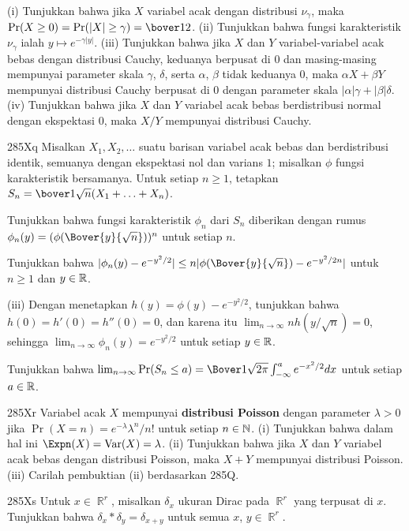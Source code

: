 {

\noindent (i) Tunjukkan bahwa jika $X$ variabel acak dengan distribusi
$\nu_{\gamma}$, maka $\Pr(X\ge 0)=\Pr(|X|\ge\gamma)=\bover12$. (ii) Tunjukkan
bahwa fungsi karakteristik $\nu_{\gamma}$ ialah
$y\mapsto e^{-\gamma|y|}$.  (iii) Tunjukkan bahwa jika $X$ dan
$Y$ variabel-variabel acak bebas dengan distribusi Cauchy, keduanya berpusat di
$0$ dan masing-masing mempunyai parameter skala $\gamma$, $\delta$, serta
$\alpha$, $\beta$ tidak keduanya $0$, maka $\alpha X+\beta Y$ mempunyai
distribusi Cauchy berpusat di $0$ dengan parameter skala
$|\alpha|\gamma+|\beta|\delta$. (iv) Tunjukkan bahwa jika $X$ dan $Y$ variabel
acak bebas berdistribusi normal dengan ekspektasi $0$, maka $X/Y$ mempunyai
distribusi Cauchy.

\sqheader 285Xq Misalkan $X_1,X_2,\ldots$ suatu barisan variabel acak bebas
dan berdistribusi identik, semuanya dengan ekspektasi nol dan varians $1$;
misalkan $\phi$ fungsi karakteristik bersamanya. Untuk setiap $n\ge 1$,
tetapkan $S_n=\bover1{\sqrt{n}}(X_1+\ldots+X_n)$.

 Tunjukkan bahwa fungsi karakteristik $\phi_n$ dari $S_n$
diberikan dengan rumus $\phi_n(y)=(\phi(\Bover{y}{\sqrt{n}}))^{n}$
untuk setiap $n$.

 Tunjukkan bahwa
$|\phi_n(y)-e^{-y^2/2}|\le n|\phi(\Bover{y}{\sqrt{n}})-e^{-y^2/2n}|$
untuk $n\ge 1$ dan $y\in\Bbb R$.

\ifdim\pagewidth>467pt\fontdimen3\tenrm=3.33pt\fi
\quad(iii) Dengan menetapkan $h(y)=\phi(y)-e^{-y^2/2}$, tunjukkan bahwa
$h(0)=h'(0)=h''(0)=0$, dan karena itu
$\lim_{n\to\infty} nh(y/\sqrt{n})=0$, sehingga
$\lim_{n\to\infty}\phi_n(y)=e^{-y^2/2}$ untuk setiap $y\in\Bbb R$.
\tenrm=1.67pt

 Tunjukkan bahwa $\lim_{n\to\infty}\Pr(S_n\le a)
=\Bover1{\sqrt{2\pi}}\int_{-\infty}^ae^{-x^2/2}dx$ untuk setiap
$a\in\Bbb R$.

\sqheader 285Xr
Variabel acak $X$ mempunyai {\bf distribusi Poisson}
dengan parameter $\lambda>0$ jika $\Pr(X=n)=e^{-\lambda}\lambda^n/n!$ untuk
setiap $n\in\Bbb N$. (i) Tunjukkan bahwa dalam hal ini
$\Expn(X)=\Var(X)=\lambda$. (ii) Tunjukkan bahwa jika $X$ dan $Y$ variabel
acak bebas dengan distribusi Poisson, maka $X+Y$ mempunyai distribusi Poisson.
(iii) Carilah pembuktian (ii) berdasarkan 285Q.

\sqheader 285Xs Untuk $x\in\BbbR^r$, misalkan $\delta_x$ ukuran Dirac pada
$\BbbR^r$ yang terpusat di $x$. Tunjukkan bahwa
$\delta_x*\delta_y=\delta_{x+y}$ untuk semua $x$, $y\in\BbbR^r$.

}

